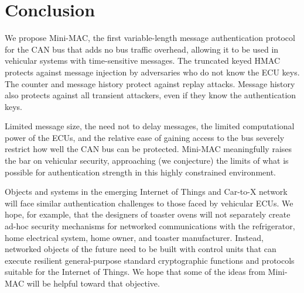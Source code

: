 \section{Conclusion}
\label{conclude}

We propose Mini-MAC, the first variable-length message authentication
protocol for the CAN bus that adds no bus traffic overhead, 
allowing it to be used in vehicular systems with time-sensitive messages.  
The truncated keyed HMAC protects against
message injection by adversaries who do not know the ECU keys.  
The counter and message history protect against replay attacks.  
Message history also protects against all transient attackers, even if they know the authentication keys.

Limited message size, the need not to delay messages, the limited computational power of the ECUs,
and the relative ease of gaining access to the bus severely restrict how well the CAN bus can be protected.  
Mini-MAC meaningfully raises the bar on vehicular security,
approaching (we conjecture) the limits of what is possible for authentication strength in this highly
constrained environment.

Objects and systems in the emerging Internet of Things and Car-to-X network
will face similar authentication challenges to those faced by 
vehicular ECUs.  We hope, for example, that the designers of toaster ovens will not
separately create ad-hoc security mechanisms for networked communications with
the refrigerator, home electrical system, home owner, and toaster manufacturer.
Instead, networked objects of the future need to be built with 
control units that can execute resilient general-purpose standard cryptographic 
functions and protocols suitable for the Internet of Things.  We hope that some
of the ideas from Mini-MAC will be helpful toward that objective.

